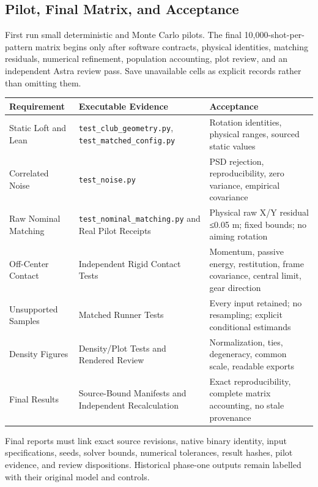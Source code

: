 \documentclass[
]{article}
\begin{document}
\subsection{Pilot, Final Matrix, and
Acceptance}\label{pilot-final-matrix-and-acceptance}

First run small deterministic and Monte Carlo pilots. The final
10,000-shot-per-pattern matrix begins only after software contracts,
physical identities, matching residuals, numerical refinement,
population accounting, plot review, and an independent Astra review
pass. Save unavailable cells as explicit records rather than omitting
them.

\begin{longtable}[]{@{}lll@{}}
\toprule\noalign{}
Requirement & Executable Evidence & Acceptance \\
\midrule\noalign{}
\endhead
\bottomrule\noalign{}
\endlastfoot
Static Loft and Lean & \texttt{test\_club\_geometry.py},
\texttt{test\_matched\_config.py} & Rotation identities, physical
ranges, sourced static values \\
Correlated Noise & \texttt{test\_noise.py} & PSD rejection,
reproducibility, zero variance, empirical covariance \\
Raw Nominal Matching & \texttt{test\_nominal\_matching.py} and Real
Pilot Receipts & Physical raw X/Y residual ≤0.05 m; fixed bounds; no
aiming rotation \\
Off-Center Contact & Independent Rigid Contact Tests & Momentum, passive
energy, restitution, frame covariance, central limit, gear direction \\
Unsupported Samples & Matched Runner Tests & Every input retained; no
resampling; explicit conditional estimands \\
Density Figures & Density/Plot Tests and Rendered Review &
Normalization, ties, degeneracy, common scale, readable exports \\
Final Results & Source-Bound Manifests and Independent Recalculation &
Exact reproducibility, complete matrix accounting, no stale
provenance \\
\end{longtable}

Final reports must link exact source revisions, native binary identity,
input specifications, seeds, solver bounds, numerical tolerances, result
hashes, pilot evidence, and review dispositions. Historical phase-one
outputs remain labelled with their original model and controls.
\end{document}
